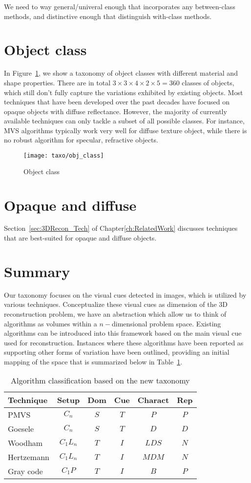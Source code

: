 We need to way general/univeral enough that incorporates any between-class methods, and distinctive enough that distinguish with-class methods.

\section{Object class}
In Figure~\ref{fig:obj_class}, we show a taxonomy of object classes with different material and shape properties. There are in total $3\times 3\times 4\times 2\times 5 = 360$ classes of objects, which still don't fully capture the variations exhibited by existing objects. Most techniques that have been developed over the past decades have focused on opaque objects with diffuse reflectance. However, the majority of currently available techniques can only tackle a subset of all possible classes. For instance, MVS algorithms typically work very well for diffuse texture object, while there is no robust algorithm for specular, refractive objects.
\begin{figure}[h]
\centering
\texttt{[image: taxo/obj\_class]}
\label{fig:obj_class}
\caption{Object class}
\end{figure}

\section{Opaque and diffuse}
Section~\ref{sec:3DRecon_Tech} of Chapter\ref{ch:RelatedWork} discusses techniques that are best-suited for opaque and diffuse objects.

\section{Summary}
Our taxonomy focuses on the visual cues detected in images, which is utilized by various techniques. Conceptualize these visual cues as dimension of the 3D reconstruction problem, we have an abstraction which allow us to think of algorithms as volumes within a $n-$dimensional problem space. Existing algorithms can be introduced into this framework based on the main visual cue used for reconstruction. Instances where these algorithms have been reported as supporting other forms of variation have been outlined, providing an initial mapping of the space that is summarized below in Table~\ref{tab:algo_label}.
\begin{table}[h]
  \centering
  \begin{tabular}{l*{5}{c}}
  \hline
  \textbf{Technique} & Setup & Dom & Cue & Charact & Rep\\
  \hline
  PMVS & $C_n$ & $S$ & $T$ & $P$ & $P$\\
  Goesele & $C_n$ & $S$ & $T$ & $D$ & $D$\\
  Woodham & $C_1L_n$ & $T$ & $I$ & $LDS$ & $N$\\
  Hertzemann & $C_1L_n$ & $T$ & $I$ & $MDM$ & $N$\\
  Gray code & $C_1P$ & $T$ & $I$ & $B$ & $P$\\
  \hline
  \end{tabular}
  \label{tab:algo_label}
  \caption{Algorithm classification based on the new taxonomy}
\end{table}
